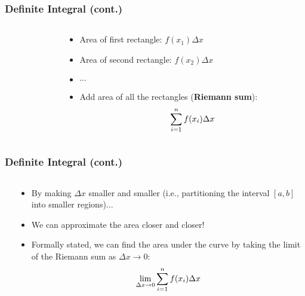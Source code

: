 \documentclass[pdflatex, 12pt]{beamer}
\begin{document}
\begin{frame}
\frametitle{Definite Integral (cont.)}
\begin{columns}
\begin{column}{0.5\textwidth}
\end{column}
\begin{column}{0.5\textwidth}
\begin{itemize}
\item Area of first rectangle: $f(x_1) \Delta x$
\vspace{0.4cm}
\item Area of second rectangle: $f(x_2) \Delta x$
\vspace{0.4cm}
\item $\cdots$
\vspace{0.4cm}
\item Add area of all the rectangles (\textbf{Riemann sum}):
 \begin{equation}
 \sum_{i = 1}^{n} f(x_i) \Delta x \notag
 \end{equation}
\end{itemize}
\end{column}
\end{columns}
\end{frame}

\begin{frame}
\frametitle{Definite Integral (cont.)}
\begin{columns}
\begin{column}{0.5\textwidth}
\end{column}
\begin{column}{0.5\textwidth}
\begin{itemize}
\item By making $\Delta x$ smaller and smaller (i.e., partitioning the interval $[a,b]$ into smaller regions)...
\vspace{0.4cm}
\item We can approximate the area closer and closer!
\vspace{0.4cm}
\item Formally stated, we can find the area under the curve by taking the limit of the Riemann sum as $\Delta x \to 0$:
 \begin{equation}
 \lim_{\Delta x \to 0} \sum_{i = 1}^{n} f(x_i) \Delta x \notag
 \end{equation}
\end{itemize}
\end{column}
\end{columns}
\end{frame}
\end{document}
